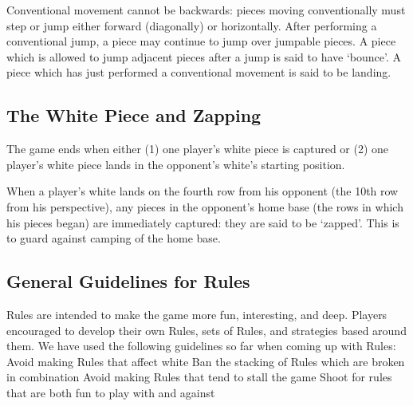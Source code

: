 \documentclass[../rulebook.tex]{subfiles}
\begin{document}
Conventional movement cannot be backwards:
pieces moving conventionally must step or jump either forward
(diagonally) or horizontally.
After performing a conventional jump,
a piece may continue to jump over jumpable pieces.
A piece which is allowed to jump adjacent pieces after a jump
is said to have `bounce'.
A piece which has just performed a conventional movement
is said to be landing.

\subsection*{The White Piece and Zapping}
The game ends when either (1) one player’s white piece is captured or
(2) one player’s white piece lands in the opponent’s
white’s starting position.

When a player’s white lands on the fourth row from his opponent
(the 10th row from his perspective),
any pieces in the opponent’s home base
(the rows in which his pieces began) are immediately captured:
they are said to be `zapped'.
This is to guard against camping of the home base.

\subsection*{General Guidelines for Rules}
Rules are intended to make the game more fun, interesting, and deep.
Players encouraged to develop their own Rules, sets of Rules,
and strategies based around them.
We have used the following guidelines so far when coming up with Rules:
 Avoid making Rules that affect white
 Ban the stacking of Rules which are broken in combination
 Avoid making Rules that tend to stall the game
 Shoot for rules that are both fun to play with and against
\end{document}
